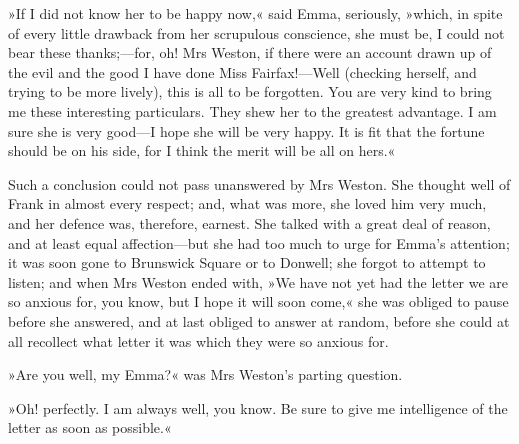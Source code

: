 »If I did not know her to be happy now,« said Emma, seriously, »which, in spite of every little drawback from her scrupulous conscience, she must be, I could not bear these thanks;—for, oh! Mrs Weston, if there were an account drawn up of the evil and the good I have done Miss Fairfax!—Well (checking herself, and trying to be more lively), this is all to be forgotten. You are very kind to bring me these interesting particulars. They shew her to the greatest advantage. I am sure she is very good—I hope she will be very happy. It is fit that the fortune should be on his side, for I think the merit will be all on hers.«

Such a conclusion could not pass unanswered by Mrs Weston. She thought well of Frank in almost every respect; and, what was more, she loved him very much, and her defence was, therefore, earnest. She talked with a great deal of reason, and at least equal affection—but she had too much to urge for Emma's attention; it was soon gone to Brunswick Square or to Donwell; she forgot to attempt to listen; and when Mrs Weston ended with, »We have not yet had the letter we are so anxious for, you know, but I hope it will soon come,« she was obliged to pause before she answered, and at last obliged to answer at random, before she could at all recollect what letter it was which they were so anxious for.

»Are you well, my Emma?« was Mrs Weston's parting question.

»Oh! perfectly. I am always well, you know. Be sure to give me intelligence of the letter as soon as possible.«


